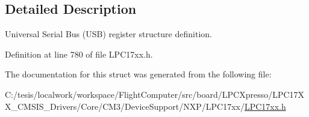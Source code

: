 \subsection{\-Detailed \-Description}
\-Universal \-Serial \-Bus (\-U\-S\-B) register structure definition. 

\-Definition at line 780 of file \-L\-P\-C17xx.\-h.



\-The documentation for this struct was generated from the following file\-:\begin{DoxyCompactItemize}
\item 
\-C\-:/tesis/localwork/workspace/\-Flight\-Computer/src/board/\-L\-P\-C\-Xpresso/\-L\-P\-C17\-X\-X\-\_\-\-C\-M\-S\-I\-S\-\_\-\-Drivers/\-Core/\-C\-M3/\-Device\-Support/\-N\-X\-P/\-L\-P\-C17xx/\hyperlink{_l_p_c17xx_8h}{\-L\-P\-C17xx.\-h}\end{DoxyCompactItemize}
